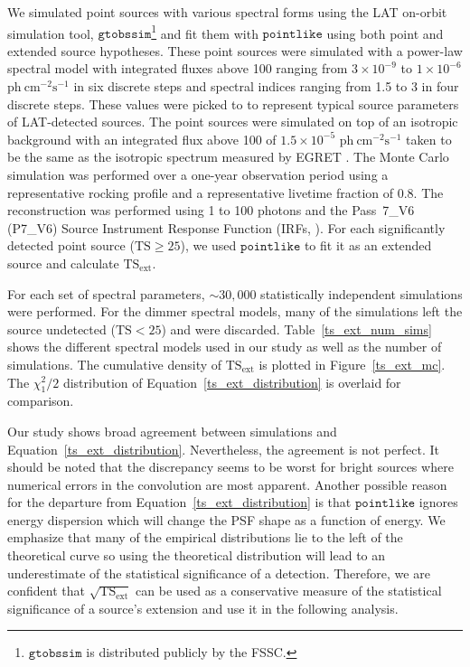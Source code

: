 \documentclass[12pt,preprint]{aastex}
\newcommand{\mev}{\text{MeV}\xspace}
\newcommand{\gev}{\text{GeV}\xspace}
\newcommand{\s}{\text{s}\xspace}
\newcommand{\ph}{\text{ph}\xspace}
\newcommand{\cm}{\text{cm}\xspace}
\newcommand{\phflux}{\ensuremath{\ph\ \cm^{-2}\s^{-1}}\xspace}
\newcommand{\tsext}{{\ensuremath{\text{TS}_{\text{ext}}}}\xspace}
\newcommand{\ts}{\text{TS}\xspace}
\newcommand{\pointlike}{\ensuremath{\mathtt{pointlike}}\xspace}
\newcommand{\gtobssim}{\ensuremath{\mathtt{gtobssim}}\xspace}
\begin{document}
We simulated point sources with various spectral forms using
the LAT on-orbit simulation tool, 
\gtobssim\footnote{\gtobssim is distributed publicly by the FSSC.} and fit them with \pointlike using both point
and extended source hypotheses.  These point sources were simulated with a power-law
spectral model with integrated fluxes above 100 \mev ranging from $3\times10^{-9}$ 
to $1\times10^{-6}$ \phflux in six discrete steps and spectral
indices ranging from 1.5 to 3 in four discrete steps.  These values
were picked to to represent typical source parameters of LAT-detected
sources. The point sources were simulated on top of an isotropic
background with an integrated flux above 100 \mev of $1.5\times10^{-5}$ \phflux
taken to be the same as the isotropic spectrum measured by EGRET
\citep{sreekumar_isotropic}.  The Monte Carlo simulation was performed
over a one-year observation period using a representative rocking profile and a
representative livetime fraction of 0.8.  The reconstruction was performed
using 1 \gev to 100 \gev photons and the Pass~7\_V6 (P7\_V6) Source Instrument
Response Function (IRFs, \cite{lat_on_orbit_psf}).  For each 
significantly detected point source ($\ts\ge25$), we used \pointlike
to fit it as an extended source and calculate \tsext.


For each set of spectral parameters, $\sim30,000$ statistically independent
simulations were performed. For the dimmer spectral models, many of the
simulations left the source undetected ($\ts<25$)
and were discarded.  Table~\ref{ts_ext_num_sims}
shows the different spectral models used in our study as well as the
number of simulations.  The cumulative density of \tsext is plotted in
Figure~\ref{ts_ext_mc}. The $\chi^2_1/2$ distribution of
Equation~\ref{ts_ext_distribution} is overlaid for comparison.

Our study shows broad agreement between simulations and
Equation~\ref{ts_ext_distribution}. Nevertheless, the agreement is not
perfect.  It should be noted that the discrepancy seems to be worst for
bright sources where numerical errors in the convolution
are most apparent.  Another possible
reason for the departure from Equation~\ref{ts_ext_distribution} 
is that \pointlike ignores energy dispersion which will change the
PSF shape as a function of energy. We emphasize that many of
the empirical distributions lie to the left of the theoretical curve so
using the theoretical distribution will lead to an underestimate of the
statistical significance of a detection. Therefore, we are confident that
$\sqrt{\tsext}$ can be used as a conservative measure of the statistical
significance of a source's extension and use it in the following analysis.
\end{document}
